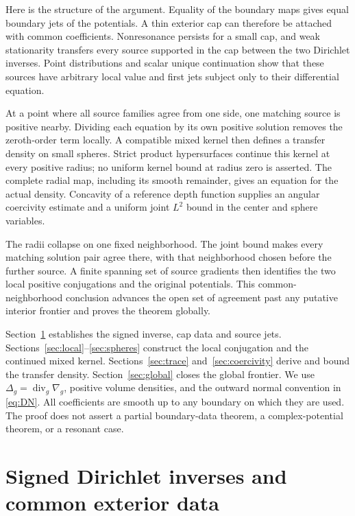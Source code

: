 \documentclass[11pt]{article}
\theoremstyle{definition}\newtheorem{definition}[theorem]{Definition}
\theoremstyle{remark}\newtheorem{remark}[theorem]{Remark}
\newcommand{\Div}{\operatorname{div}}
\begin{document}
Here is the structure of the argument. Equality of the boundary maps gives
equal boundary jets of the potentials. A thin exterior cap can therefore
be attached with common coefficients. Nonresonance persists for a small
cap, and weak stationarity transfers every source supported in the cap
between the two Dirichlet inverses. Point distributions and scalar unique
continuation show that these sources have arbitrary local value and first
jets subject only to their differential equation.

At a point where all source families agree from one side, one matching
source is positive nearby. Dividing each equation by its own positive
solution removes the zeroth-order term locally. A compatible mixed kernel
then defines a transfer density on small spheres. Strict product
hypersurfaces continue this kernel at every positive radius; no uniform
kernel bound at radius zero is asserted. The complete radial map, including
its smooth remainder, gives an equation for the actual density. Concavity
of a reference depth function supplies an angular coercivity estimate and
a uniform joint $L^2$ bound in the center and sphere variables.

The radii collapse on one fixed neighborhood. The joint bound makes every
matching solution pair agree there, with that neighborhood chosen before
the further source. A finite spanning set of source gradients then
identifies the two local positive conjugations and the original potentials.
This common-neighborhood conclusion advances the open set of agreement
past any putative interior frontier and proves the theorem globally.

Section~\ref{sec:cap} establishes the signed inverse, cap data and source
jets. Sections~\ref{sec:local}--\ref{sec:spheres} construct the local
conjugation and the continued mixed kernel. Sections~\ref{sec:trace}
and~\ref{sec:coercivity} derive and bound the transfer density.
Section~\ref{sec:global} closes the global frontier. We use
$\Delta_g=\Div_g\nabla_g$, positive volume densities, and the outward
normal convention in \eqref{eq:DN}. All coefficients are smooth up to
any boundary on which they are used. The proof does not assert a partial
boundary-data theorem, a complex-potential theorem, or a resonant case.


\section{Signed Dirichlet inverses and common exterior data}\label{sec:cap}
\end{document}
